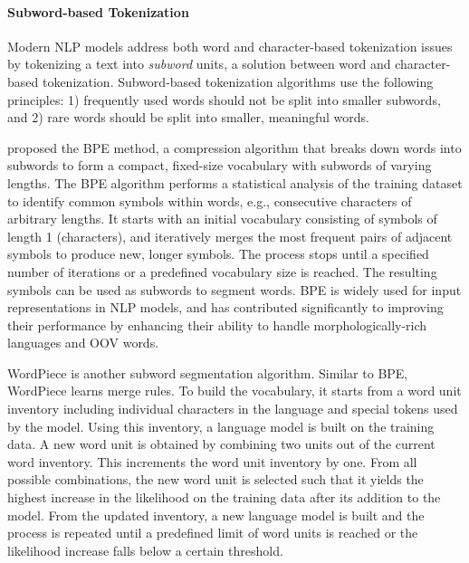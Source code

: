 \paragraph{Subword-based Tokenization} Modern \ac{NLP} models address both word and character-based tokenization issues by tokenizing a text into \textit{subword} units, a solution between word and character-based tokenization. Subword-based tokenization algorithms use the following principles: 1) frequently used words should not be split into smaller subwords, and 2) rare words should be split into smaller, meaningful words. 

\citet{gage1994new} proposed the \ac{BPE} method, a compression algorithm that breaks down words into subwords to form a compact, fixed-size vocabulary with subwords of varying lengths. The \ac{BPE} algorithm performs a statistical analysis of the training dataset to identify common symbols within words, e.g., consecutive characters of arbitrary lengths. It starts with an initial vocabulary consisting of symbols of length 1 (characters), and iteratively merges the most frequent pairs of adjacent symbols to produce new, longer symbols. The process stops until a specified number of iterations or a predefined vocabulary size is reached. The resulting symbols can be used as subwords to segment words. \ac{BPE} is widely used for input representations in \ac{NLP} models, and has contributed significantly to improving their performance by enhancing their ability to handle morphologically-rich languages and \ac{OOV} words.

WordPiece \citep{wu2016google} is another subword segmentation algorithm. Similar to \ac{BPE}, WordPiece learns merge rules. To build the vocabulary, it starts from a word unit inventory including individual characters in the language and special tokens used by the model. Using this inventory, a language model is built on the training data. A new word unit is obtained by combining two units out of the current word inventory. This increments the word unit inventory by one. From all possible combinations, the new word unit is selected such that it yields the highest increase in the likelihood on the training data after its addition to the model. From the updated inventory, a new language model is built and the process is repeated until a predefined limit of word units is reached or the likelihood increase falls below a certain threshold. 


